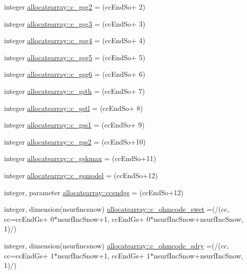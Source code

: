 \begin{DoxyCompactItemize}
integer \hyperlink{namespaceallocatearray_a2b115354208d6b09535bda0cee499316}{allocatearray\+::c\+\_\+gsg2} = (cc\+End\+So+ 2)
\item 
integer \hyperlink{namespaceallocatearray_a70972d48cf32e2ae2f264134371657eb}{allocatearray\+::c\+\_\+gsg3} = (cc\+End\+So+ 3)
\item 
integer \hyperlink{namespaceallocatearray_ade39cdbf936049001075bb06589629d8}{allocatearray\+::c\+\_\+gsg4} = (cc\+End\+So+ 4)
\item 
integer \hyperlink{namespaceallocatearray_a1b25f9c9a9281958b7ed21d0bb85dde1}{allocatearray\+::c\+\_\+gsg5} = (cc\+End\+So+ 5)
\item 
integer \hyperlink{namespaceallocatearray_ab8971a61a031605df883466bf12f9c11}{allocatearray\+::c\+\_\+gsg6} = (cc\+End\+So+ 6)
\item 
integer \hyperlink{namespaceallocatearray_abf62bf3e83784366ed95fdfaae1f1d92}{allocatearray\+::c\+\_\+gsth} = (cc\+End\+So+ 7)
\item 
integer \hyperlink{namespaceallocatearray_aa11ae08cca1b320e3e176e06ac0daa50}{allocatearray\+::c\+\_\+gstl} = (cc\+End\+So+ 8)
\item 
integer \hyperlink{namespaceallocatearray_aee67f7f4bcae37b7727fdeeb7570e7de}{allocatearray\+::c\+\_\+gss1} = (cc\+End\+So+ 9)
\item 
integer \hyperlink{namespaceallocatearray_af79468bbe3d4485e8a4f27d33c674864}{allocatearray\+::c\+\_\+gss2} = (cc\+End\+So+10)
\item 
integer \hyperlink{namespaceallocatearray_a69cae8cc47b53e83d621a7abe318ff14}{allocatearray\+::c\+\_\+gskmax} = (cc\+End\+So+11)
\item 
integer \hyperlink{namespaceallocatearray_a0372ecc61cfb88ee683fac861aab87ac}{allocatearray\+::c\+\_\+gsmodel} = (cc\+End\+So+12)
\item 
integer, parameter \hyperlink{namespaceallocatearray_a58b7fd051dfe010900cccf4da1dd09c0}{allocatearray\+::ccendgs} = (cc\+End\+So+12)
\item 
integer, dimension(nsurfincsnow) \hyperlink{namespaceallocatearray_a2b9b6b72c78faf563c2341e3e9d5e93d}{allocatearray\+::c\+\_\+ohmcode\+\_\+swet} =(/(cc, cc=cc\+End\+Gs+ 0$\ast$nsurf\+Inc\+Snow+1, cc\+End\+Gs+ 0$\ast$nsurf\+Inc\+Snow+nsurf\+Inc\+Snow, 1)/)
\item 
integer, dimension(nsurfincsnow) \hyperlink{namespaceallocatearray_a22d9674e6c45c469b459ce0ac39d6320}{allocatearray\+::c\+\_\+ohmcode\+\_\+sdry} =(/(cc, cc=cc\+End\+Gs+ 1$\ast$nsurf\+Inc\+Snow+1, cc\+End\+Gs+ 1$\ast$nsurf\+Inc\+Snow+nsurf\+Inc\+Snow, 1)/)

\end{DoxyCompactItemize}
